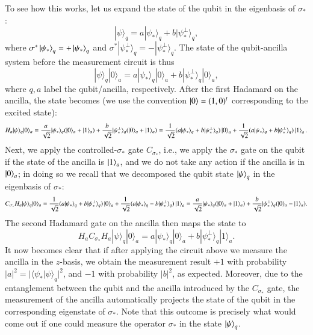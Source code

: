 To see how this works, let us expand the state of the qubit in the eigenbasis of $\sigma_\ast$:
\begin{equation}
    |\psi\rangle_q = a|\psi_\ast\rangle_q + b|\psi_\ast^\perp\rangle_q,
\end{equation}
where $\sigma^\ast\ket{\psi_\ast}_q=+\ket{\psi_\ast}_q$ and $\sigma^\ast|\psi_\ast^\perp\rangle_q=-|\psi_\ast^\perp\rangle_q$.
The state of the qubit-ancilla system before the measurement circuit is thus 
\begin{equation}
    |\psi\rangle_q |0\rangle_a = a|\psi_\ast\rangle_q|0\rangle_a + b|\psi_\ast^\perp\rangle_q |0\rangle_a,
\end{equation}
where $q,a$ label the qubit/ancilla, respectively. After the first Hadamard on the ancilla, the state becomes (we use the convention $\ket{0}=(1,0)^t$ corresponding to the excited state):
\begin{equation}
    H_a|\psi\rangle_q |0\rangle_a = 
\frac{a}{\sqrt 2}|\psi_\ast\rangle_q(|0\rangle_a+|1\rangle_a) + \frac{b}{\sqrt 2}|\psi_\ast^\perp\rangle_q(|0\rangle_a+|1\rangle_a)
=\frac{1}{\sqrt 2}( a|\psi_\ast\rangle_q + b |\psi_\ast^\perp\rangle_q)\ket{0}_a + \frac{1}{\sqrt 2}( a|\psi_\ast\rangle_q + b |\psi_\ast^\perp\rangle_q )\ket{1}_a. 
\end{equation}
Next, we apply the controlled-$\sigma_\ast$ gate $C_{\sigma_\ast}$, i.e., we apply the $\sigma_\ast$ gate on the qubit if the state of the ancilla is $\ket{1}_a$, and we do not take any action if the ancilla is in $\ket{0}_a$; in doing so we recall that we decomposed the qubit state $\ket{\psi}_q$ in the eigenbasis of $\sigma_\ast$:
\begin{equation}
    C_{\sigma_\ast} H_a|\psi\rangle_q |0\rangle_a = \frac{1}{\sqrt 2}( a|\psi_\ast\rangle_q + b |\psi_\ast^\perp\rangle_q)\ket{0}_a + \frac{1}{\sqrt 2}( a|\psi_\ast\rangle_q - b |\psi_\ast^\perp\rangle_q )\ket{1}_a =\frac{a}{\sqrt 2}|\psi_\ast\rangle_q(|0\rangle_a+|1\rangle_a) + \frac{b}{\sqrt 2}|\psi_\ast^\perp\rangle_q(|0\rangle_a-|1\rangle_a).
\end{equation}
The second Hadamard gate on the ancilla then maps the state to
\begin{equation}
    H_aC_{\sigma_\ast} H_a|\psi\rangle_q |0\rangle_a = a|\psi_\ast\rangle_q|0\rangle_a + b|\psi_\ast^\perp\rangle_q |1\rangle_a.
\end{equation}
It now becomes clear that if after applying the circuit above we measure the ancilla in the $z$-basis, we obtain the measurement result $+1$ with probability $|a|^2=|\langle\psi_\ast |\psi\rangle_q|^2$, and $-1$ with probability $|b|^2$, as expected. Moreover, due to the entanglement between the qubit and the ancilla introduced by the $C_{\sigma_\ast}$ gate, the measurement of the ancilla automatically projects the state of the qubit in the corresponding eigenstate of $\sigma_\ast$. Note that this outcome is precisely what would come out if one could measure the operator $\sigma_\ast$ in the state $\ket{\psi}_q$.



